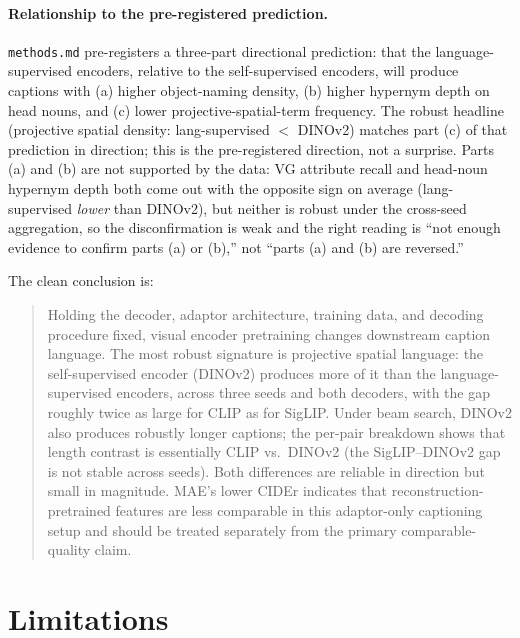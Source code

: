 \documentclass[11pt]{article}
\newcommand{\code}[1]{\texttt{#1}}
\begin{document}
\paragraph{Relationship to the pre-registered prediction.}
\code{methods.md} pre-registers a three-part directional prediction: that
the language-supervised encoders, relative to the self-supervised
encoders, will produce captions with (a) higher object-naming density,
(b) higher hypernym depth on head nouns, and (c) lower projective-spatial-term
frequency. The robust headline (projective spatial density: lang-supervised
\(<\) DINOv2) matches part (c) of that prediction in direction; this is the
pre-registered direction, not a surprise. Parts (a) and (b) are not
supported by the data: VG attribute recall and head-noun hypernym depth
both come out with the opposite sign on average (lang-supervised
\emph{lower} than DINOv2), but neither is robust under the cross-seed
aggregation, so the disconfirmation is weak and the right reading is
``not enough evidence to confirm parts (a) or (b),'' not ``parts (a) and
(b) are reversed.''

The clean conclusion is:

\begin{quote}
Holding the decoder, adaptor architecture, training data, and decoding
procedure fixed, visual encoder pretraining changes downstream caption
language. The most robust signature is projective spatial language: the
self-supervised encoder (DINOv2) produces more of it than the
language-supervised encoders, across three seeds and both decoders, with the
gap roughly twice as large for CLIP as for SigLIP. Under beam search, DINOv2
also produces robustly longer captions; the per-pair breakdown shows that
length contrast is essentially CLIP vs.\ DINOv2 (the SigLIP--DINOv2 gap is
not stable across seeds). Both differences are reliable in direction but
small in magnitude. MAE's lower CIDEr indicates that reconstruction-pretrained
features are less comparable in this adaptor-only captioning setup and should
be treated separately from the primary comparable-quality claim.
\end{quote}

\section{Limitations}
\end{document}
